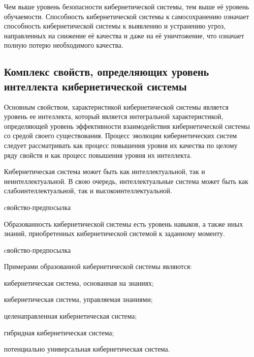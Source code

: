 Чем выше уровень безопасности кибернетической системы, тем выше её уровень обучаемости.
Способность кибернетической системы к самосохранению означает способность кибернетической системы к выявлению и устранению угроз, направленных на снижение её качества и даже на её уничтожение, что означает полную потерю необходимого качества.


\subsection{Комплекс свойств, определяющих уровень интеллекта кибернетической системы}
{\label{sec_cyb_syst_intelligence_quality}} 

Основным свойством, характеристикой кибернетической системы является уровень ее интеллекта, который является интегральной характеристикой, определяющей уровень эффективности взаимодействия кибернетической системы со средой своего существования.
Процесс эволюции кибернетических систем следует рассматривать как процесс повышения уровня их качества по целому ряду свойств и как процесс повышения уровня их интеллекта.

Кибернетическая система может быть как интеллектуальной, так и неинтеллектуальной. В свою очередь, интеллектуальные система может быть как слабоинтеллектуальной, так и высокоинтеллектуальной.

\begin{SCn}
\begin{scnrelfromlist}{cвойство-предпосылка}
\end{scnrelfromlist}
\end{SCn}

Образованность кибернетической системы есть уровень навыков, а также иных знаний, приобретенных кибернетической системой к заданному моменту. 

\begin{SCn}
\begin{scnrelfromlist}{cвойство-предпосылка}
\end{scnrelfromlist}
\end{SCn}

Примерами образованной кибернетической системы являются:
\begin{textitemize}
    \item кибернетическая система, основанная на знаниях;
    \item кибернетическая система, управляемая знаниями;
    \item целенаправленная кибернетическая система;
    \item гибридная кибернетическая система;
    \item потенциально универсальная кибернетическая система.
\end{textitemize}

